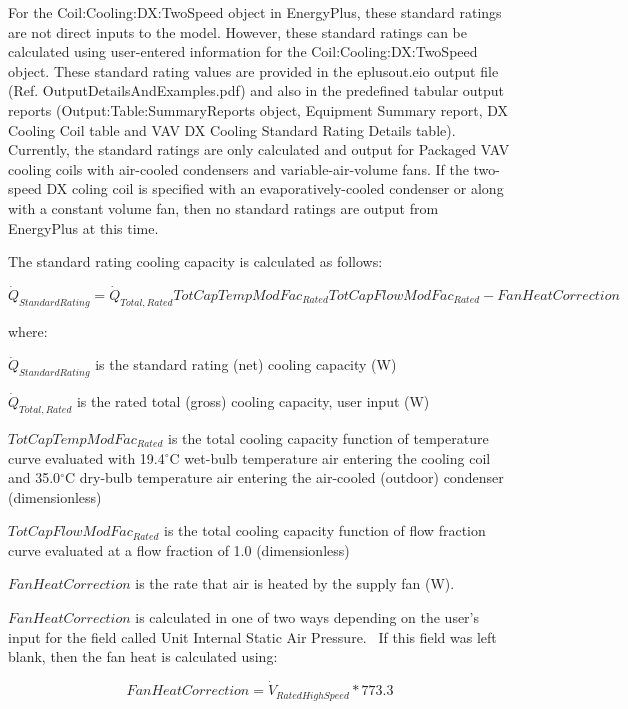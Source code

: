 For the Coil:Cooling:DX:TwoSpeed object in EnergyPlus, these standard ratings are not direct inputs to the model. However, these standard ratings can be calculated using user-entered information for the Coil:Cooling:DX:TwoSpeed object. These standard rating values are provided in the eplusout.eio output file (Ref. OutputDetailsAndExamples.pdf) and also in the predefined tabular output reports (Output:Table:SummaryReports object, Equipment Summary report, DX Cooling Coil table and VAV DX Cooling Standard Rating Details table). Currently, the standard ratings are only calculated and output for Packaged VAV cooling coils with air-cooled condensers and variable-air-volume fans. If the two-speed DX coling coil is specified with an evaporatively-cooled condenser or along with a constant volume fan, then no standard ratings are output from EnergyPlus at this time.

The standard rating cooling capacity is calculated as follows:

\begin{equation}
\dot{Q}_{StandardRating} = \dot{Q}_{Total,Rated} TotCapTempModFac_{Rated} TotCapFlowModFac_{Rated} - FanHeatCorrection
\end{equation}

where:

\({\dot Q_{StandardRating}}\) is the standard rating (net) cooling capacity (W)

\({\dot Q_{Total,Rated}}\) is the rated total (gross) cooling capacity, user input (W)

\(TotCapTempModFa{c_{Rated}}\) is the total cooling capacity function of temperature curve evaluated with 19.4\(^{\circ}\)C wet-bulb temperature air entering the cooling coil and 35.0\(^{\circ}\)C dry-bulb temperature air entering the air-cooled (outdoor) condenser (dimensionless)

\(TotCapFlowModFa{c_{Rated}}\) is the total cooling capacity function of flow fraction curve evaluated at a flow fraction of 1.0 (dimensionless)

\(FanHeatCorrection\) is the rate that air is heated by the supply fan (W).

\(FanHeatCorrection\) is calculated in one of two ways depending on the user's input for the field called Unit Internal Static Air Pressure.~ If this field was left blank, then the fan heat is calculated using:

\begin{equation}
FanHeatCorrection = {\dot V_{RatedHighSpeed}}*773.3
\end{equation}

